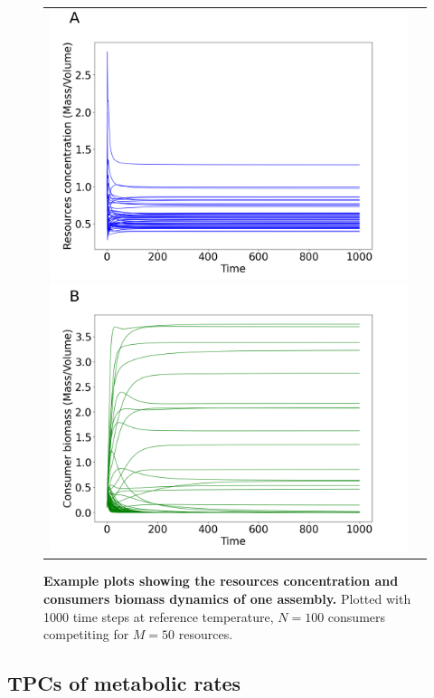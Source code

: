 \begin{figure}[H]
    \centering
    \begin{tabular}{c@{}c@{}}
    \includegraphics[scale=0.27]{./Figures/resource_con_example.png}
    \includegraphics[scale=0.27]{./Figures/consumer_con_example.png}
    \end{tabular}
    \caption{\textbf{Example plots showing the resources concentration and consumers biomass dynamics of one assembly.} Plotted with 1000 time steps at reference temperature, $N = 100$ consumers competiting for $M = 50$ resources.}
    \label{fig:example}
\end{figure}

\subsection{TPCs of metabolic rates}

